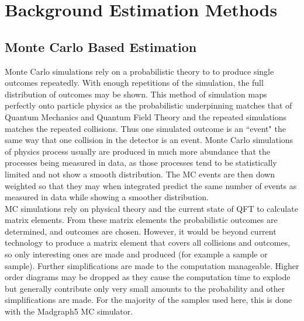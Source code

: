 \chapter{Background Estimation Methods}
	\section{Monte Carlo Based Estimation}
	\label{sec:irreducible_estimation}
	
	Monte Carlo simulations rely on a probabilistic theory to to produce single outcomes repeatedly. With enough repetitions of the simulation, the full distribution of outcomes may be shown. This method of simulation maps perfectly onto particle physics as the probabilistic underpinning matches that of Quantum Mechanics and Quantum Field Theory and the repeated simulations matches the repeated collisions. Thus one simulated outcome is an ``event" the same way that one collision in the detector is an event. Monte Carlo simulations of physics process usually are produced in much more abundance that the processes being measured in data, as those processes tend to be statistically limited and not show a smooth distribution. The MC events are then down weighted so that they may when integrated predict the same number of events as measured in data while showing a smoother distribution.\\
	
	MC simulations rely on physical theory and the current state of QFT to calculate matrix elements. From these matrix elements the probabilistic outcomes are determined, and outcomes are chosen. However, it would be beyond current technology to produce a matrix element that covers all collisions and outcomes, so only interesting ones are made and produced (for example a \ttZ sample or \WZZ sample). Further simplifications are made to the computation manageable. Higher order diagrams may be dropped as they cause the computation time to explode but generally contribute only very small amounts to the probability and other simplifications are made. For the majority of the samples used here, this is done with the Madgraph5 MC simulator.\\
	
